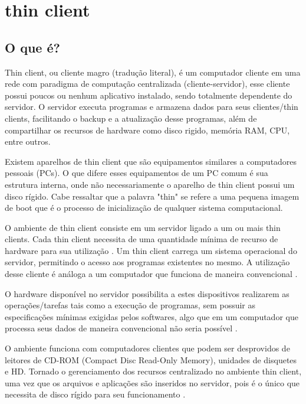 \documentclass[
	12pt,				%
	openright,			%
	twoside,			%
	a4paper,			%
	chapter=TITLE,		%
	english,			%
	brazil				%
	]{abntex2}
\begin{document}
\chapter{thin client}
\label{refe:thinclient}
\section{O que é?}

Thin client, ou cliente magro (tradução literal), é um computador cliente em uma rede  com paradigma de computação centralizada (cliente-servidor), esse cliente possui poucos ou nenhum aplicativo instalado, sendo totalmente dependente do servidor. O servidor executa programas e armazena dados para seus clientes/thin clients, facilitando o backup e a atualização desse programas, além de compartilhar os recursos de hardware como disco rigido, memória RAM, CPU, entre outros\cite{ComoFuncionaThinClient, tanenbaum2010sistemas}.

Existem aparelhos de thin client que são equipamentos similares a computadores pessoais (PCs). O que difere esses equipamentos de um PC comum é sua estrutura interna, onde não necessariamente o aparelho de thin client possui um disco rígido. Cabe ressaltar que a palavra "thin" se refere a uma pequena imagem de boot que é o processo de inicialização de qualquer sistema computacional\cite{ComoFuncionaThinClient}.

O ambiente de thin client consiste em um servidor ligado a um ou mais thin clients. Cada thin client necessita de uma quantidade mínima de recurso de hardware para sua utilização \cite{TopologiaClienteThin}. Um thin client carrega um sistema operacional do servidor, permitindo o acesso aos  programas existentes no mesmo. A utilização desse cliente é análoga a um computador que funciona de maneira convencional \cite{ComoFuncionaThinClient, morimotoservidores}.

O hardware disponível no servidor possibilita a estes dispositivos realizarem as operações/tarefas tais como a execução de programas, sem possuir as especificações mínimas exigidas pelos softwares, algo que em um computador que processa seus dados de maneira convencional não seria possível \cite{tanenbaum2010sistemas}.

O ambiente funciona com computadores clientes que podem ser desprovidos de leitores de CD-ROM (Compact Disc Read-Only Memory), unidades de disquetes e HD. Tornado o gerenciamento dos recursos centralizado no ambiente thin client, uma vez que os  arquivos e aplicações são inseridos no servidor, pois é o único que necessita de disco rígido para seu funcionamento \cite{tanenbaum2010sistemas, ComoFuncionaThinClient}.
\end{document}
